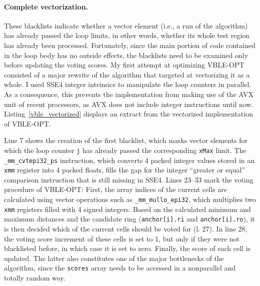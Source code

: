\paragraph{Complete vectorization.} 
These blacklists indicate whether a vector element (i.e., a run of the algorithm) has already passed the loop limits, in other words, whether its whole test region has already been processed. Fortunately, since the main portion of code contained in the loop body has no outside effects, the blacklists need to be examined only before updating the voting scores. My first attempt at optimizing VBLE-OPT consisted of a major rewrite of the algorithm that targeted at vectorizing it as a whole. I used SSE4 integer intrinsics to manipulate the loop counters in parallel. As a consequence, this prevents the implementation from making use of the AVX unit of recent processors, as AVX does not include integer instructions until now. Listing~\ref{vble_vectorized} displays an extract from the vectorized implementation of VBLE-OPT.


Line 7 shows the creation of the first blacklist, which masks vector elements for which the loop counter \texttt{j} has already passed the corresponding \texttt{xMax} limit. The \texttt{\_mm\_cvtepi32\_ps} instruction, which converts 4 packed integer values stored in an \texttt{xmm} register into 4 packed floats, fills the gap for the integer ``greater or equal'' comparison instruction that is still missing in SSE4. Lines 23--33 mark the voting procedure of VBLE-OPT: First, the array indices of the current cells are calculated using vector operations such as \texttt{\_mm\_mullo\_epi32}, which multiplies two \texttt{xmm} registers filled with 4 signed integers. Based on the calculated minimum and maximum distances and the candidate ring (\texttt{anchor[i].ri} and \texttt{anchor[i].ro}), it is then decided which of the current cells should be voted for (l. 27). In line 28, the voting score increment of these cells is set to 1, but only if they were not blacklisted before, in which case it is set to zero. Finally, the score of each cell is updated. The latter also constitutes one of the major bottlenecks of the algorithm, since the \texttt{scores} array needs to be accessed in a nonparallel and totally random way.

